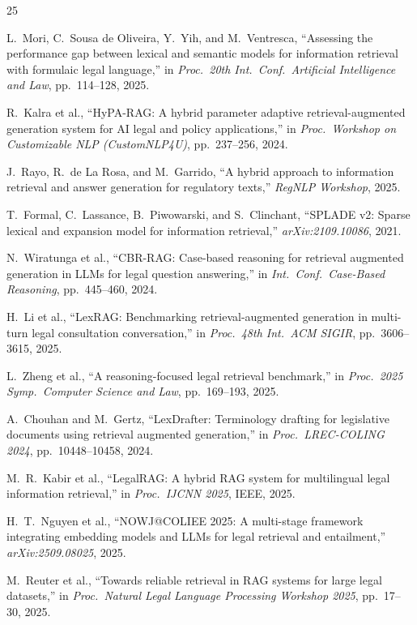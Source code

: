 \documentclass[conference,a4paper]{IEEEtran}
\begin{document}
\footnotesize
\renewcommand{\baselinestretch}{0.91}\selectfont
\begin{thebibliography}{25}

L.~Mori, C.~Sousa de Oliveira, Y.~Yih, and M.~Ventresca,
``Assessing the performance gap between lexical and semantic models
for information retrieval with formulaic legal language,''
in \emph{Proc.\ 20th Int.\ Conf.\ Artificial Intelligence and Law},
pp.~114--128, 2025.

R.~Kalra et al.,
``HyPA-RAG: A hybrid parameter adaptive retrieval-augmented generation
system for AI legal and policy applications,''
in \emph{Proc.\ Workshop on Customizable NLP (CustomNLP4U)},
pp.~237--256, 2024.

J.~Rayo, R.~de La Rosa, and M.~Garrido,
``A hybrid approach to information retrieval and answer generation for
regulatory texts,''
\emph{RegNLP Workshop}, 2025.

T.~Formal, C.~Lassance, B.~Piwowarski, and S.~Clinchant,
``SPLADE v2: Sparse lexical and expansion model for information
retrieval,'' \emph{arXiv:2109.10086}, 2021.

N.~Wiratunga et al.,
``CBR-RAG: Case-based reasoning for retrieval augmented generation in
LLMs for legal question answering,''
in \emph{Int.\ Conf.\ Case-Based Reasoning}, pp.~445--460, 2024.

H.~Li et al.,
``LexRAG: Benchmarking retrieval-augmented generation in multi-turn
legal consultation conversation,''
in \emph{Proc.\ 48th Int.\ ACM SIGIR}, pp.~3606--3615, 2025.

L.~Zheng et al.,
``A reasoning-focused legal retrieval benchmark,''
in \emph{Proc.\ 2025 Symp.\ Computer Science and Law},
pp.~169--193, 2025.

A.~Chouhan and M.~Gertz,
``LexDrafter: Terminology drafting for legislative documents using
retrieval augmented generation,''
in \emph{Proc.\ LREC-COLING 2024}, pp.~10448--10458, 2024.

M.~R.~Kabir et al.,
``LegalRAG: A hybrid RAG system for multilingual legal information
retrieval,''
in \emph{Proc.\ IJCNN 2025}, IEEE, 2025.

H.~T.~Nguyen et al.,
``NOWJ@COLIEE 2025: A multi-stage framework integrating embedding
models and LLMs for legal retrieval and entailment,''
\emph{arXiv:2509.08025}, 2025.

M.~Reuter et al.,
``Towards reliable retrieval in RAG systems for large legal datasets,''
in \emph{Proc.\ Natural Legal Language Processing Workshop 2025},
pp.~17--30, 2025.


\end{thebibliography}
\end{document}
